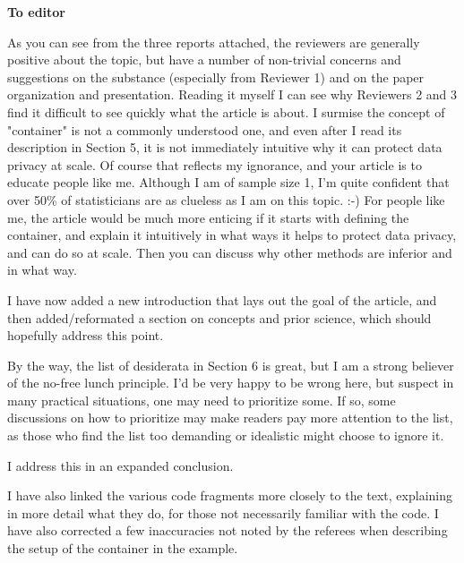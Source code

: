\textbf{To editor} 

\begin{referee}
As you can see from the three reports attached,
the reviewers are generally positive about the topic, but have a number of non-trivial concerns and
suggestions on the substance (especially from Reviewer 1) and on the paper organization and
presentation. Reading it myself I can see why Reviewers 2 and 3 find it difficult to see quickly what the
article is about. I surmise the concept of "container" is not a commonly understood one, and even
after I read its description in Section 5, it is not immediately intuitive why it can protect data privacy at
scale. Of course that reflects my ignorance, and your article is to educate people like me. Although I
am of sample size 1, I'm quite confident that over 50\% of statisticians are as clueless as I am on this
topic. :-)
For people like me, the article would be much more enticing if it starts with defining the container,
and explain it intuitively in what ways it helps to protect data privacy, and can do so at scale. Then
you can discuss why other methods are inferior and in what way. 
\end{referee}

\begin{response}
    I have now added a new introduction that lays out the goal of the article, and then added/reformated a section on concepts and prior science, which should hopefully address this point.
\end{response}

\begin{referee}
By the way, the list of desiderata in
Section 6 is great,
but I am a strong believer of the no-free lunch principle. I'd be very happy to be wrong here, but
suspect in many practical situations, one may need to prioritize some. If so, some discussions on how
to prioritize may make readers pay more attention to the list, as those who find the list too
demanding or idealistic might choose to ignore it.

\end{referee}

\begin{response}
    I address this in an expanded conclusion.

    \vspace{1em} I have also linked the various code fragments more closely to the text, explaining in more detail what they do, for those not necessarily familiar with the code. I have also corrected a few inaccuracies not noted by the referees when describing the setup of the container in the example.
\end{response}


